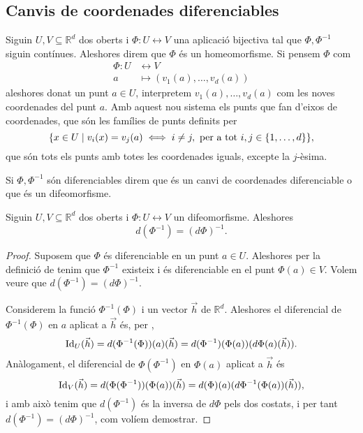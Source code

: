 \documentclass[../Apunts.tex]{subfiles}
\begin{document}
	\subsection{Canvis de coordenades diferenciables}
	\begin{definition}
		\label{def:homeomorfisme}
		\label{def:difeomorfisme}
		Siguin \(U,V\subseteq\mathbb{R}^{d}\) dos oberts i \(\Phi\colon U\longleftrightarrow V\) una aplicació bijectiva tal que \(\Phi,\Phi^{-1}\) siguin contínues. Aleshores direm que \(\Phi\) és un homeomorfisme. Si pensem \(\Phi\) com
		\begin{align*}
		\Phi\colon U&\longleftrightarrow V\\
		a&\longmapsto(v_{1}(a),\dots,v_{d}(a))
		\end{align*}
		aleshores donat un punt \(a\in U\), interpretem \(v_{1}(a),\dots,v_{d}(a)\) com les noves coordenades del punt \(a\). Amb aquest nou sistema els punts que fan d'eixos de coordenades, que són les famílies de punts definits per
		\[\{x\in U\mid v_{i}(x)=v_{j}(a)\iff i\neq j,\text{ per a tot }i,j\in\{1,\dots,d\}\},\]
		que són tots els punts amb totes les coordenades iguals, excepte la \(j\)-èsima.
		
		Si \(\Phi,\Phi^{-1}\) són diferenciables direm que és un canvi de coordenades diferenciable o que és un difeomorfisme.
	\end{definition}
	\begin{proposition}\label{prop:difeomorfisme diferenciable invertible}
		Siguin \(U,V\subseteq\mathbb{R}^{d}\) dos oberts i \(\Phi\colon U\longleftrightarrow V\) un difeomorfisme. Aleshores
		\[d(\Phi^{-1})=(d\Phi)^{-1}.\]
		\begin{proof}
			Suposem que \(\Phi\) és diferenciable en un punt \(a\in U\). Aleshores per la definició de  tenim que \(\Phi^{-1}\) existeix i és diferenciable en el punt \(\Phi(a)\in V\). Volem veure que \(d(\Phi^{-1})=(d\Phi)^{-1}\).
			
			Considerem la funció \(\Phi^{-1}(\Phi)\) i un vector \(\vec{h}\) de \(\mathbb{R}^{d}\). Aleshores el diferencial de \(\Phi^{-1}(\Phi)\) en \(a\) aplicat a \(\vec{h}\) és, per ,
			\[\operatorname{Id}_{U}(\vec{h})=d(\Phi^{-1}(\Phi))(a)(\vec{h})=d(\Phi^{-1})(\Phi(a))(d\Phi(a)(\vec{h})).\]
			Anàlogament, el diferencial de \(\Phi(\Phi^{-1})\) en \(\Phi(a)\) aplicat a \(\vec{h}\) és
			\[\operatorname{Id}_{V}(\vec{h})=d(\Phi(\Phi^{-1}))(\Phi(a))(\vec{h})=d(\Phi)(a)(d\Phi^{-1}(\Phi(a))(\vec{h})),\]
			i amb això tenim que \(d(\Phi^{-1})\) és la inversa de \(d\Phi\) pels dos costats, i per tant \(d(\Phi^{-1})=(d\Phi)^{-1}\), com volíem demostrar.
		\end{proof}%
	\end{proposition}
\end{document}
